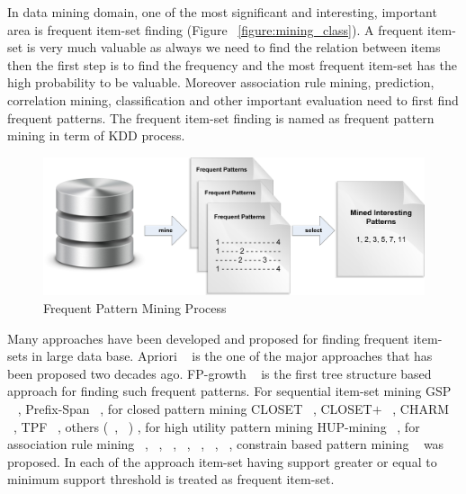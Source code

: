 In data mining domain, one of the most significant and interesting, important area is frequent item-set finding (Figure ~\ref{figure:mining_class}). A frequent item-set is very much valuable as always we need to find the relation between items then the first step is to find the frequency and the most frequent item-set has the high probability to be valuable. Moreover association rule mining, prediction, correlation mining, classification and other important evaluation need to first find frequent patterns. The frequent item-set finding is named as frequent pattern mining in term of KDD process.\\
\begin{figure}
\centering
  \includegraphics[width=.9\textwidth]{images/frequent_flow.jpg}
\caption{Frequent Pattern Mining Process}
\label{figure:frequent_flow}
\end{figure}
Many approaches have been developed and proposed for finding frequent item-sets in large data base. Apriori ~\cite{apriori} is the one of the major approaches that has been proposed two decades ago. FP-growth ~\cite{fp_growth} is the first tree structure based approach for finding such frequent patterns. For sequential item-set mining GSP ~\cite{gsp} , Prefix-Span ~\cite{prefix_span}, for closed pattern mining CLOSET ~\cite{closet}, CLOSET$+$ ~\cite{closet_plus}, CHARM ~\cite{charm}, TPF ~\cite{tpf}, others (~\cite{close_1}, ~\cite{close_2}) , for high utility pattern mining HUP-mining ~\cite{hup_mining}, for association rule mining ~\cite{ass_01}, ~\cite{ass_02}, ~\cite{ass_03}, ~\cite{ass_04}, ~\cite{ass_05}, ~\cite{ass_06}, ~\cite{ass_07}, constrain based pattern mining ~\cite{const_01} was proposed. In each of the approach item-set having support greater or equal to minimum support threshold is treated as frequent item-set.

